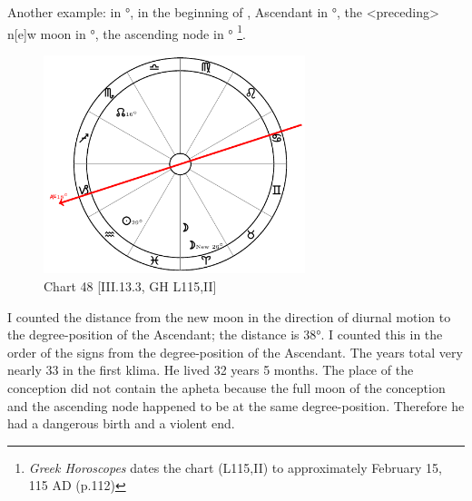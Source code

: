 \newpage

Another example: \Sun\xspace in \Aquarius\xspace 29°, \Moon\xspace in the beginning of \Aries, Ascendant in \Capricorn\xspace 18°,
the <preceding> n[e]w moon in \Aquarius\xspace 26°, the ascending node in \Scorpio\xspace 16°
\footnote{\textit{Greek Horoscopes} dates the chart (L115,II) to approximately February 15, 115 AD (p.112)}.

\clearpage
\begin{figure}
\centering
\vspace{-20pt}
\includegraphics[width=0.68\textwidth]{charts/3_13_3}
\caption{Chart 48 [III.13.3, GH L115,II]}
\label{fig:chart48}
\end{figure}

I counted the distance from the new moon in the direction of diurnal motion to the degree-position of the Ascendant; the distance is 38°. I counted this in the order of the signs from the degree-position of the Ascendant. The years total very nearly 33 in the first klima. He lived 32 years 5 months. The place of the conception did not contain the apheta because the full moon of the conception and the ascending node happened to be at the same degree-position. Therefore he had a dangerous birth and a violent end.

\newpage